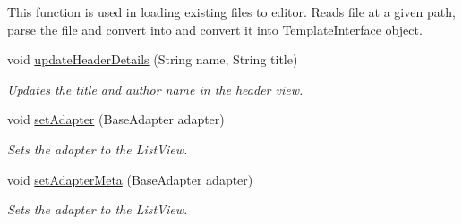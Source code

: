 \begin{DoxyCompactItemize}
\begin{DoxyCompactList}
This function is used in loading existing files to editor. Reads file at a given path, parse the file and convert into and convert it into Template\+Interface object. \end{DoxyCompactList}\item 
void \hyperlink{classorg_1_1buildmlearn_1_1toolkit_1_1activity_1_1TemplateEditor_a3d785b7595c43249fc5a73e4f69daf41}{update\+Header\+Details} (String name, String title)
\begin{DoxyCompactList}\small\item\em Updates the title and author name in the header view. \end{DoxyCompactList}\item 
void \hyperlink{classorg_1_1buildmlearn_1_1toolkit_1_1activity_1_1TemplateEditor_a5c1e35aa985ed2199d9795ad1ab03e0d}{set\+Adapter} (Base\+Adapter adapter)
\begin{DoxyCompactList}\small\item\em Sets the adapter to the List\+View. \end{DoxyCompactList}\item 
void \hyperlink{classorg_1_1buildmlearn_1_1toolkit_1_1activity_1_1TemplateEditor_acf3ac338304c57e1378633c804a860eb}{set\+Adapter\+Meta} (Base\+Adapter adapter)
\begin{DoxyCompactList}\small\item\em Sets the adapter to the List\+View. \end{DoxyCompactList}\end{DoxyCompactItemize}
